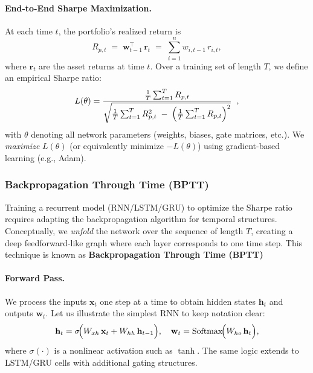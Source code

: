 \documentclass[11pt]{article}
\begin{document}
\paragraph{End-to-End Sharpe Maximization.}
At each time \(t\), the portfolio’s realized return is
\begin{equation}
    R_{p,t} \;=\; \mathbf{w}_{t-1}^{\top}\,\mathbf{r}_t 
    \;=\; \sum_{i=1}^n w_{i,t-1}\,r_{i,t},
\end{equation}
where \(\mathbf{r}_t\) are the asset returns at time \(t\). Over a training set of length \(T\), we define an empirical Sharpe ratio:
\begin{equation}\label{eq:sharpe_empirical}
    L(\theta)
    = \frac{\frac{1}{T}\sum_{t=1}^T R_{p,t}}{
    \sqrt{\frac{1}{T}\sum_{t=1}^T R_{p,t}^2
    \;-\;
    \Bigl(\frac{1}{T}\sum_{t=1}^T R_{p,t}\Bigr)^2}}
    \;\;,
\end{equation}
with \(\theta\) denoting all network parameters (weights, biases, gate matrices, etc.). We \emph{maximize} \(L(\theta)\) (or equivalently minimize \(-L(\theta)\)) using gradient-based learning (e.g., Adam).

\subsubsection{Backpropagation Through Time (BPTT)} \label{sec:bptt}
Training a recurrent model (RNN/LSTM/GRU) to optimize the Sharpe ratio requires adapting the backpropagation algorithm for temporal structures. Conceptually, we \emph{unfold} the network over the sequence of length \(T\), creating a deep feedforward-like graph where each layer corresponds to one time step. This technique is known as \textbf{Backpropagation Through Time (BPTT)}

\paragraph{Forward Pass.}
We process the inputs \(\mathbf{x}_t\) one step at a time to obtain hidden states \(\mathbf{h}_t\) and outputs \(\mathbf{w}_t\). Let us illustrate the simplest RNN to keep notation clear:
\begin{equation}
    \mathbf{h}_t = \sigma\!\Bigl(W_{xh}\,\mathbf{x}_t + W_{hh}\,\mathbf{h}_{t-1}\Bigr),
    \quad
    \mathbf{w}_t = \mathrm{Softmax}\!\Bigl(W_{ho}\,\mathbf{h}_t\Bigr),
\end{equation}
where \(\sigma(\cdot)\) is a nonlinear activation such as \(\tanh\).  The same logic extends to LSTM/GRU cells with additional gating structures.
\end{document}
